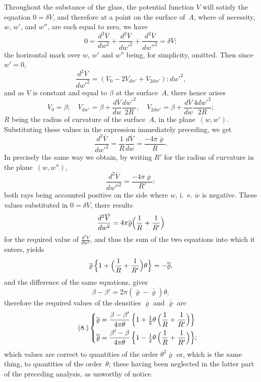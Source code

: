 \documentclass[11pt,notitlepage]{amsart}
\renewcommand{\rho}{\varrho}
\begin{document}
Throughout the substance of the glass, the potential function $V$ will
satisfy the equation ${0=\delta V}$,
and therefore at a point on the surface of~$A$,
where of necessity, $w$, $w'$, and $w''$,
are each equal to zero, we have
\[
0=\frac{d^2\overline{V}}{dw^2}
+\frac{d^2\overline{V}}{dw'^2}
+\frac{d^2\overline{V}}{dw''^2}
=\delta\overline{V};
\]
the horizontal mark over $w$, $w'$ and $w''$ being,
for simplicity, omitted. Then
since~$w'=0$,
\[
\frac{d^2\overline{V}}{dw'^2}
=(V_0-2V_{dw'}+V_{2dw'}):dw'^2,
\]
and as $V$ is constant and equal to $\beta$
at the surface~$A$, there hence arises
\[
V_0=\beta;\quad
V_{dw'}=\beta+\frac{d\overline{V}}{dw}\frac{dw'^2}{2R},\quad
V_{2dw'}=\beta+\frac{d\overline{V}}{dw}\frac{4dw'^2}{2R};
\]
$R$ being the radius of curvature of the surface~$A$,
in the plane~$(w, w')$. Substituting
these values in the expression immediately preceding, we get
\[
\frac{d^2\overline{V}}{dw'^2}
=\frac1R\frac{d\overline{V}}{dw}
=\frac{-4\pi\overline\rho}{R}.
\]
In precisely the same way we obtain, by writing $R'$ for the radius of 
curvature in the plane~$(w, w'')$,
\[
\frac{d^2\overline{V}}{dw''^2}
=\frac{-4\pi\overline\rho}{R'}:
\]
both rays being accounted positive on the side where $w$,
i.~e. $\overline{w}$ is negative.
These values substituted in $0=\delta V$, there results
\[
\frac{d^2\overline{V}}{dw^2}
=4\pi\overline\rho\Bigl(\frac1R+\frac{1}{R'}\Bigr)
\]
for the required value of $\frac{d^2V}{dw^2}$,
and thus the sum of the two equations into
which it enters, yields
\[
\overline\rho\,\Bigl\{1+\Bigl(\frac1R+\frac{1}{R'}\Bigr)\theta\Bigr\}
=-\overline{\overline\rho},
\]
and the difference of the same equations, gives
\[
\beta-\beta'=2\pi(\overline\rho-\overline{\overline\rho})\theta,
\]
therefore the required values of the densities
$\overline\rho$ and $\overline{\overline\rho}$ are
\[
\tag{8.}
\left\{
  \begin{aligned}
  \overline\rho &=
  \frac{\beta-\beta'}{4\pi\theta}
  \,\Bigl\{1+\tfrac12\theta\,\Bigl(\frac1R+\frac{1}{R'}\Bigr)\Bigr\}\\
  \overline{\overline\rho} &=
  \frac{\beta'-\beta}{4\pi\theta}
  \,\Bigl\{1-\tfrac12\theta\,\Bigl(\frac1R+\frac{1}{R'}\Bigr)\Bigr\};
  \end{aligned}
\right.
\]
which values are correct to quantities
of the order $\theta^2\overline\rho$ or, which is the same
thing, to quantities of the order~$\theta$;
these having been neglected in the latter
part of the preceding analysis, as unworthy of notice.
\end{document}
